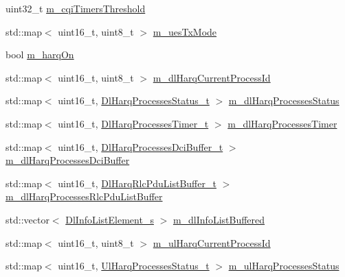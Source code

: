 \begin{DoxyCompactItemize}
uint32\+\_\+t \hyperlink{classns3_1_1CqaFfMacScheduler_ab2ea609b39ce10062f2bdd8027dd6edd}{m\+\_\+cqi\+Timers\+Threshold}
\item 
std\+::map$<$ uint16\+\_\+t, uint8\+\_\+t $>$ \hyperlink{classns3_1_1CqaFfMacScheduler_ac556c4275bc3c2c078fd5856069ba0ca}{m\+\_\+ues\+Tx\+Mode}
\item 
bool \hyperlink{classns3_1_1CqaFfMacScheduler_afcb424ab57ad0d96293a7970c0b55dcf}{m\+\_\+harq\+On}
\item 
std\+::map$<$ uint16\+\_\+t, uint8\+\_\+t $>$ \hyperlink{classns3_1_1CqaFfMacScheduler_a1fc0136a3398fb51805a2a91e40d820e}{m\+\_\+dl\+Harq\+Current\+Process\+Id}
\item 
std\+::map$<$ uint16\+\_\+t, \hyperlink{namespacens3_a457b3571b67ff17d042e9894e90e2ce2}{Dl\+Harq\+Processes\+Status\+\_\+t} $>$ \hyperlink{classns3_1_1CqaFfMacScheduler_ad68bd0730def22b00204de5f3a8fb109}{m\+\_\+dl\+Harq\+Processes\+Status}
\item 
std\+::map$<$ uint16\+\_\+t, \hyperlink{namespacens3_a39413ade536de4b1c82d6c0074cc703e}{Dl\+Harq\+Processes\+Timer\+\_\+t} $>$ \hyperlink{classns3_1_1CqaFfMacScheduler_a2e130ab374b4770c3544495ba593f023}{m\+\_\+dl\+Harq\+Processes\+Timer}
\item 
std\+::map$<$ uint16\+\_\+t, \hyperlink{namespacens3_af25599bf8f9f564075c005759c9af18c}{Dl\+Harq\+Processes\+Dci\+Buffer\+\_\+t} $>$ \hyperlink{classns3_1_1CqaFfMacScheduler_a4de0e4833545b31fcb31f77492a34380}{m\+\_\+dl\+Harq\+Processes\+Dci\+Buffer}
\item 
std\+::map$<$ uint16\+\_\+t, \hyperlink{namespacens3_a4c0cbd1e72f1c667f8b5879655f13210}{Dl\+Harq\+Rlc\+Pdu\+List\+Buffer\+\_\+t} $>$ \hyperlink{classns3_1_1CqaFfMacScheduler_a019cbb20e91d699a8c7e26fb8d69ff4e}{m\+\_\+dl\+Harq\+Processes\+Rlc\+Pdu\+List\+Buffer}
\item 
std\+::vector$<$ \hyperlink{structns3_1_1DlInfoListElement__s}{Dl\+Info\+List\+Element\+\_\+s} $>$ \hyperlink{classns3_1_1CqaFfMacScheduler_aabc929a8c1c30338a5fa0826bb7cd2b8}{m\+\_\+dl\+Info\+List\+Buffered}
\item 
std\+::map$<$ uint16\+\_\+t, uint8\+\_\+t $>$ \hyperlink{classns3_1_1CqaFfMacScheduler_a55974c35f8b783bb902ae8676fb6ff10}{m\+\_\+ul\+Harq\+Current\+Process\+Id}
\item 
std\+::map$<$ uint16\+\_\+t, \hyperlink{namespacens3_af765c4daaafe4ea4809c1041fc196629}{Ul\+Harq\+Processes\+Status\+\_\+t} $>$ \hyperlink{classns3_1_1CqaFfMacScheduler_a6dd8ea014c55132578f7c050e726f856}{m\+\_\+ul\+Harq\+Processes\+Status}
\item 

\end{DoxyCompactItemize}
